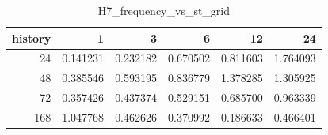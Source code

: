\begin{table}
\caption{H7_frequency_vs_st_grid}
\label{tab:H7_frequency_vs_st_grid}
\begin{tabular}{rrrrrr}
\toprule
history & 1 & 3 & 6 & 12 & 24 \\
\midrule
24 & 0.141231 & 0.232182 & 0.670502 & 0.811603 & 1.764093 \\
48 & 0.385546 & 0.593195 & 0.836779 & 1.378285 & 1.305925 \\
72 & 0.357426 & 0.437374 & 0.529151 & 0.685700 & 0.963339 \\
168 & 1.047768 & 0.462626 & 0.370992 & 0.186633 & 0.466401 \\
\bottomrule
\end{tabular}
\end{table}
